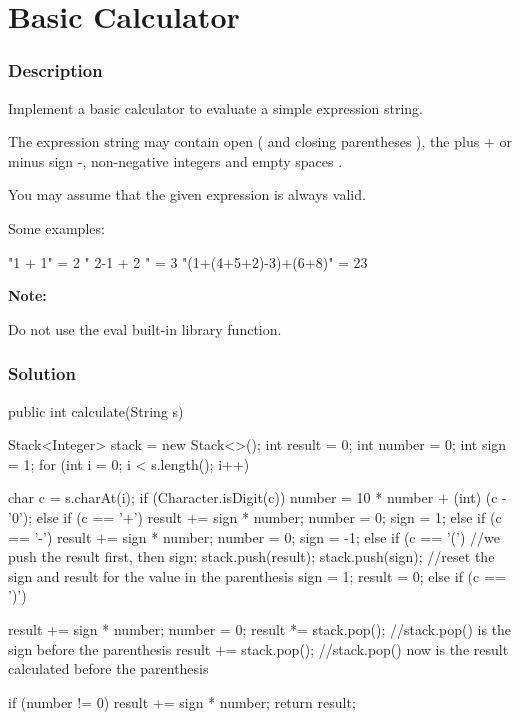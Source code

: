 \newpage

\section{Basic Calculator} %

\subsubsection{Description}
Implement a basic calculator to evaluate a simple expression string.

The expression string may contain open ( and closing parentheses ), the plus + or minus sign -, non-negative integers and empty spaces .

You may assume that the given expression is always valid.

Some examples:
\begin{Code}
"1 + 1" = 2
" 2-1 + 2 " = 3
"(1+(4+5+2)-3)+(6+8)" = 23

\textbf{Note:}

Do not use the eval built-in library function.

\end{Code}

\subsubsection{Solution}

\begin{Code}
public int calculate(String s) {
    Stack<Integer> stack = new Stack<>();
    int result = 0;
    int number = 0;
    int sign = 1;
    for (int i = 0; i < s.length(); i++) {
        char c = s.charAt(i);
        if (Character.isDigit(c)) {
            number = 10 * number + (int) (c - '0');
        } else if (c == '+') {
            result += sign * number;
            number = 0;
            sign = 1;
        } else if (c == '-') {
            result += sign * number;
            number = 0;
            sign = -1;
        } else if (c == '(') {
            //we push the result first, then sign;
            stack.push(result);
            stack.push(sign);
            //reset the sign and result for the value in the parenthesis
            sign = 1;
            result = 0;
        } else if (c == ')') {
            result += sign * number;
            number = 0;
            result *= stack.pop();    //stack.pop() is the sign before the parenthesis
            result += stack.pop();   //stack.pop() now is the result calculated before the parenthesis

        }
    }
    if (number != 0) result += sign * number;
    return result;
}
\end{Code}

